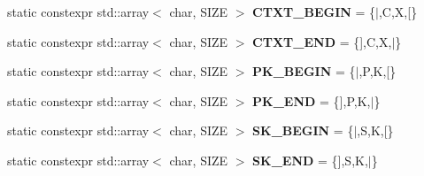 \begin{DoxyCompactItemize}
\item 
\mbox{\label{structhelib_1_1EyeCatcher_a999ce2bbb06d4a014d8a6c26cf98a081}} 
static constexpr std\+::array$<$ char, S\+I\+ZE $>$ {\bfseries C\+T\+X\+T\+\_\+\+B\+E\+G\+IN} = \{\textquotesingle{}$\vert$\textquotesingle{},\textquotesingle{}C\textquotesingle{},\textquotesingle{}X\textquotesingle{},\textquotesingle{}\mbox{[}\textquotesingle{}\}
\item 
\mbox{\label{structhelib_1_1EyeCatcher_a461d1aab3bd3f9d852b7eb9b6d59f5a4}} 
static constexpr std\+::array$<$ char, S\+I\+ZE $>$ {\bfseries C\+T\+X\+T\+\_\+\+E\+ND} = \{\textquotesingle{}\mbox{]}\textquotesingle{},\textquotesingle{}C\textquotesingle{},\textquotesingle{}X\textquotesingle{},\textquotesingle{}$\vert$\textquotesingle{}\}
\item 
\mbox{\label{structhelib_1_1EyeCatcher_a3b4c2aa861bb54af7ce853f1adce0075}} 
static constexpr std\+::array$<$ char, S\+I\+ZE $>$ {\bfseries P\+K\+\_\+\+B\+E\+G\+IN} = \{\textquotesingle{}$\vert$\textquotesingle{},\textquotesingle{}P\textquotesingle{},\textquotesingle{}K\textquotesingle{},\textquotesingle{}\mbox{[}\textquotesingle{}\}
\item 
\mbox{\label{structhelib_1_1EyeCatcher_a05c61de8fc69c1d9901970f3326c4304}} 
static constexpr std\+::array$<$ char, S\+I\+ZE $>$ {\bfseries P\+K\+\_\+\+E\+ND} = \{\textquotesingle{}\mbox{]}\textquotesingle{},\textquotesingle{}P\textquotesingle{},\textquotesingle{}K\textquotesingle{},\textquotesingle{}$\vert$\textquotesingle{}\}
\item 
\mbox{\label{structhelib_1_1EyeCatcher_a44be4edf97d79313bd0121d5ecd094a8}} 
static constexpr std\+::array$<$ char, S\+I\+ZE $>$ {\bfseries S\+K\+\_\+\+B\+E\+G\+IN} = \{\textquotesingle{}$\vert$\textquotesingle{},\textquotesingle{}S\textquotesingle{},\textquotesingle{}K\textquotesingle{},\textquotesingle{}\mbox{[}\textquotesingle{}\}
\item 
\mbox{\label{structhelib_1_1EyeCatcher_a152ea33234d1830a7ffc7ccd91e93235}} 
static constexpr std\+::array$<$ char, S\+I\+ZE $>$ {\bfseries S\+K\+\_\+\+E\+ND} = \{\textquotesingle{}\mbox{]}\textquotesingle{},\textquotesingle{}S\textquotesingle{},\textquotesingle{}K\textquotesingle{},\textquotesingle{}$\vert$\textquotesingle{}\}

\end{DoxyCompactItemize}
